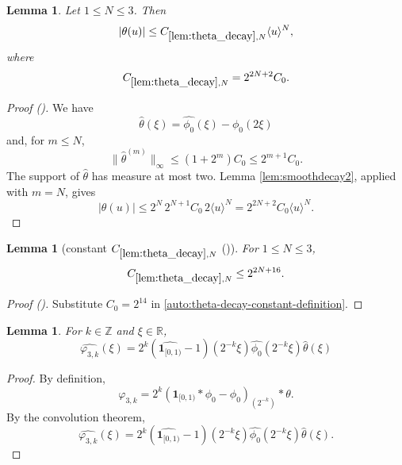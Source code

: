 \documentclass[12pt,reqno]{amsart}
\newcommand{\auto}{{({\tiny\faCar})}}
\theoremstyle{plain}
\newtheorem{lemma}[theorem]{Lemma}
\numberwithin{equation}{section}
\theoremstyle{remark}
\newcommand{\using}[1]{}
\begin{document}
\begin{lemma}\label{lem:theta_decay}\using{lem:smoothdecay2}
Let $1\le N\le3$. Then
\begin{equation}\label{auto:theta-decay}
|\theta(u)|\le C_{\ref{lem:theta_decay},N}\langle u\rangle^N,
\end{equation}
where
\begin{equation}\label{auto:theta-decay-constant-definition}
C_{\ref{lem:theta_decay},N}=2^{2N+2}C_0.
\end{equation}
\end{lemma}
\begin{proof}[Proof \auto]
We have
\[
\widehat\theta(\xi)=\widehat{\phi_0}(\xi)-\widehat{\phi_0}(2\xi)
\]
and, for $m\le N$,
\[
\|\widehat\theta^{(m)}\|_\infty
\le(1+2^m)C_0\le2^{m+1}C_0.
\]
The support of $\widehat\theta$ has measure at most two. Lemma \ref{lem:smoothdecay2}, applied with $m=N$, gives
\[
|\theta(u)|
\le2^N\,2^{N+1}C_0\,2\langle u\rangle^N
=2^{2N+2}C_0\langle u\rangle^N.
\]
\end{proof}

\begin{lemma}[constant $C_{\ref{lem:theta_decay},N}$ \auto]\label{constant theta decay}\using{lem:theta_decay}
For $1\le N\le3$,
\begin{equation}\label{constant theta decay bound}
C_{\ref{lem:theta_decay},N}\le2^{2N+16}.
\end{equation}
\end{lemma}
\begin{proof}[Proof \auto]
Substitute $C_0=2^{14}$ in \eqref{auto:theta-decay-constant-definition}.
\end{proof}


\begin{lemma}\label{lem:ft_phi3_eq}
For $k\in\mathbb{Z}$ and $\xi\in\mathbb{R}$,
\begin{equation}\label{auto:varphi-three-Fourier-transform} \widehat{\varphi_{3,k}}(\xi) = 2^k(\widehat{\mathbf{1}_{[0,1)}}-1)(2^{-k}\xi)\widehat{\phi_0}(2^{-k}\xi)\widehat{\theta}(\xi) \end{equation}
\end{lemma}

\begin{proof}
By definition,
\[\varphi_{3,k} = 2^k (\mathbf{1}_{[0,1)} * \phi_0 - \phi_0)_{(2^{-k}) }*\theta.\]
By the convolution theorem,
\[\widehat{\varphi_{3,k}}(\xi) = 2^k(\widehat{\mathbf{1}_{[0,1)}}-1)(2^{-k}\xi)\widehat{\phi_0}(2^{-k}\xi)\widehat{\theta}(\xi).\]
\end{proof}
\end{document}
